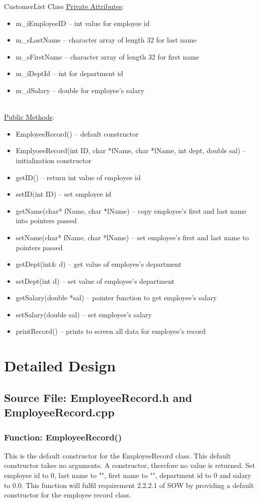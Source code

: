 \documentclass[12pt]{article}%
\newcounter{subsubsubsection}[subsubsection]
\begin{document}
CustomerList Class
\underline{Private Attributes}:
\begin{itemize}
    \item m\_iEmployeeID -- int value for employee id
    \item m\_sLastName -- character array of length 32 for last name
    \item m\_sFirstName -- character array of length 32 for first name
    \item m\_iDeptId -- int for department id
    \item m\_dSalary -- double for employee's salary
    \end{itemize}
    \hfill\\
\underline{Public Methods}:
\begin{itemize}
    \item EmployeeRecord() -- default constructor
    \item EmplyoeeRecord(int ID, char *fName, char *lName, int dept, double sal) -- initialization constructor
    \item getID() -- return int value of employee id
    \item setID(int ID) -- set employee id
    \item getName(char* fName, char *lName) -- copy employee's first and last name into pointers passed
    \item setName(char* fName, char *lName) -- set employee's first and last name to pointers passed
    \item getDept(int\& d) -- get value of employee's department
    \item setDept(int d) -- set value of employee's department
    \item getSalary(double *sal) -- pointer function to get employee's salary
    \item setSalary(double sal) -- set employee's salary
    \item printRecord() -- prints to screen all data for employee's record
\end{itemize}


\section{Detailed Design}
\subsection{Source File: EmployeeRecord.h and EmployeeRecord.cpp}
\subsubsection{Function: EmployeeRecord()}
This is the default constructor for the EmployeeRecord class.
This default constructor takes no arguments.
A constructor, therefore no value is returned.
Set employee id to 0, last name to "", first name to "", department id to 0 and salary to 0.0.
This function will fulfil requirement 2.2.2.1 of SOW by providing a default constructor for the
employee record class.
\end{document}
